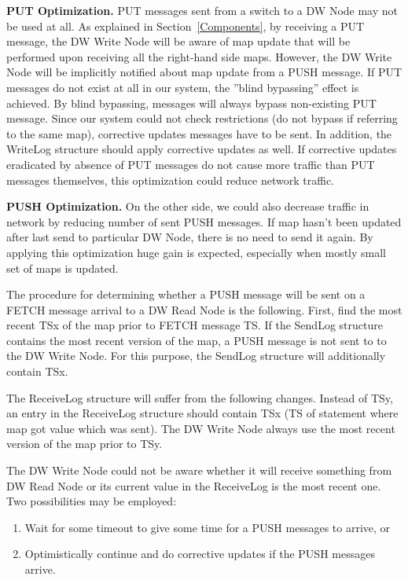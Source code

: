 \documentclass{sig-semester}
\begin{document}
\textbf{PUT Optimization.} PUT messages sent from a switch to a DW Node may not be used at all. As explained in Section~\ref{Components}, by receiving a PUT message, the DW Write Node will be aware of map update that will be performed upon receiving all the right-hand side maps. However, the DW Write Node will be implicitly notified about map update from a PUSH message. If PUT messages do not exist at all in our system, the ''blind bypassing'' effect is achieved. By blind bypassing, messages will always bypass non-existing PUT message. Since our system could not check restrictions (do not bypass if referring to the same map), corrective updates messages have to be sent. In addition, the WriteLog structure should apply corrective updates as well. If corrective updates eradicated by absence of PUT messages do not cause more traffic than PUT messages themselves, this optimization could reduce network traffic.

\textbf{PUSH Optimization.} On the other side, we could also decrease traffic in network by reducing number of sent PUSH messages. If map hasn't been updated after last send to particular DW Node, there is no need to send it again. By applying this optimization huge gain is expected, especially when mostly small set of maps is updated. 

The procedure for determining whether a PUSH message will be sent on a FETCH message arrival to a DW Read Node is the following. First, find the most recent TSx of the map prior to FETCH message TS. If the SendLog structure contains the most recent version of the map, a PUSH message is not sent to to the DW Write Node. For this purpose, the SendLog structure will additionally contain TSx.

The ReceiveLog structure will suffer from the following changes. Instead of TSy, an entry in the ReceiveLog structure should contain TSx (TS of statement where map got value which was sent). The DW Write Node always use the most recent version of the map prior to TSy.

The DW Write Node could not be aware whether it will receive something from DW Read Node or its current value in the ReceiveLog is the most recent one. Two possibilities may be employed:
\begin{enumerate}[(1)]
 \item Wait for some timeout to give some time for a PUSH messages to arrive, or
 \item Optimistically continue and do corrective updates if the PUSH messages arrive. 
\end{enumerate}
\end{document}
